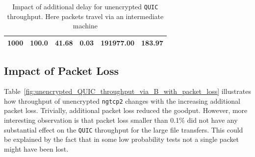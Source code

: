 \documentclass[12pt,a4paper]{report}
\begin{document}
\begin{table}[H]
\begin{tabular}{|l|l|l|l|l|l|}
1000                                                                                            & 100.0                                                                                                                  & 41.68                                                                                                                                      & 0.03                                                                                                                              & 191977.00                                                                                             & 183.97                                                                                                                                  \\ \hline
\end{tabular}
 \centering
    \caption[Impact of additional delay for unencrypted \texttt{QUIC} throughput]{Impact of additional delay for unencrypted \texttt{QUIC} throughput. Here packets travel via an intermediate machine}
    \label{fig:unencrypted_QUIC_throughput_via_B_with_packet_delay}
\end{table}



\subsection{Impact of Packet Loss}

Table~\ref{fig:unencrypted_QUIC_throughput_via_B_with_packet_loss} illustrates how throughput of unencrypted \texttt{ngtcp2} changes with the increasing additional packet loss.
Trivially, additional packet loss reduced the goodput.
However, more interesting observation is that packet loss smaller than 0.1\% did not have any substantial effect on the \texttt{QUIC} throughput for the large file transfers.
This could be explained by the fact that in some low probability tests not a single packet might have been lost. 
\end{document}
